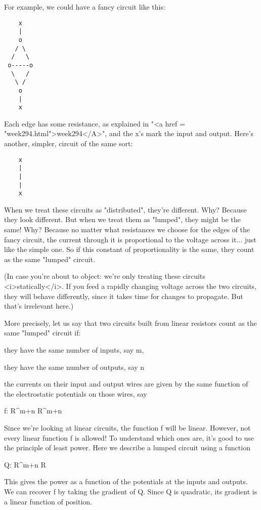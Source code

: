 For example, we could have a fancy circuit like this:

\begin{verbatim}
    x
    |
    o
   / \
  /   \
 o-----o
  \   /
   \ /
    o
    |
    x
\end{verbatim}
    

Each edge has some resistance, as explained in "<a href =
"week294.html">week294</A>", and the x's mark the input and
output.  Here's another, simpler, circuit of the same sort:

\begin{verbatim}
    x
    |
    |
    |
    x
\end{verbatim}
    

When we treat these circuits as "distributed", they're different.
Why?  Because they look different.  But when we treat them as
"lumped", they might be the same!  Why?  Because no matter what
resistances we choose for the edges of the fancy circuit, the current
through it is proportional to the voltage across it... just like the
simple one.  So if this constant of proportionality is the same, they
count as the same "lumped" circuit.

(In case you're about to object: we're only treating these circuits
<i>statically</i>.  If you feed a rapidly changing voltage across the two
circuits, they will behave differently, since it takes time for
changes to propagate.  But that's irrelevant here.)

More precisely, let us say that two circuits built from linear
resistors count as the same "lumped" circuit if:

   they have the same number of inputs, say m,

   they have the same number of outputs, say n

   the currents on their input and output wires are given by the 
   same function of the electrostatic potentials on those wires,
   say

   f: R^{m+n}  \to  R^{m+n}

Since we're looking at linear circuits, the function f will be linear.
However, not every linear function f is allowed!  To understand which
ones are, it's good to use the principle of least power.  Here we 
describe a lumped circuit using a function

Q: R^{m+n} \to  R 

This gives the power as a function of the potentials at the inputs and
outputs.  We can recover f by taking the gradient of Q.  Since Q is
quadratic, its gradient is a linear function of position.

